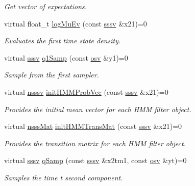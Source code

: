 \begin{DoxyCompactItemize}
\begin{DoxyCompactList}\small\item\em Get vector of expectations. \end{DoxyCompactList}\item 
virtual float\+\_\+t \hyperlink{classrbpf__hmm_af744e8a4961b5b51b7aea6ce515e0780}{log\+Mu\+Ev} (const \hyperlink{classrbpf__hmm_a28e8ad1d93bcf53cb74603f74826a81c}{sssv} \&x21)=0
\begin{DoxyCompactList}\small\item\em Evaluates the first time state density. \end{DoxyCompactList}\item 
virtual \hyperlink{classrbpf__hmm_a28e8ad1d93bcf53cb74603f74826a81c}{sssv} \hyperlink{classrbpf__hmm_a2e4a7f73efe8a3ba32e1762885624a42}{q1\+Samp} (const \hyperlink{classrbpf__hmm_adafd37687fdd3bb776d3d33a5b0e7080}{osv} \&y1)=0
\begin{DoxyCompactList}\small\item\em Sample from the first sampler. \end{DoxyCompactList}\item 
virtual \hyperlink{classrbpf__hmm_a7988465662f94f2ba45fd22566828d0f}{nsssv} \hyperlink{classrbpf__hmm_a3944acc8066774eaa0ff4330301447a1}{init\+H\+M\+M\+Prob\+Vec} (const \hyperlink{classrbpf__hmm_a28e8ad1d93bcf53cb74603f74826a81c}{sssv} \&x21)=0
\begin{DoxyCompactList}\small\item\em Provides the initial mean vector for each H\+MM filter object. \end{DoxyCompactList}\item 
virtual \hyperlink{classrbpf__hmm_a7ae942768da71581665168d3c3063c3f}{nsss\+Mat} \hyperlink{classrbpf__hmm_a997a21d39e1f692c28968000e809309a}{init\+H\+M\+M\+Trans\+Mat} (const \hyperlink{classrbpf__hmm_a28e8ad1d93bcf53cb74603f74826a81c}{sssv} \&x21)=0
\begin{DoxyCompactList}\small\item\em Provides the transition matrix for each H\+MM filter object. \end{DoxyCompactList}\item 
virtual \hyperlink{classrbpf__hmm_a28e8ad1d93bcf53cb74603f74826a81c}{sssv} \hyperlink{classrbpf__hmm_a449e0c123c92bbe4fedacad65f9ba7be}{q\+Samp} (const \hyperlink{classrbpf__hmm_a28e8ad1d93bcf53cb74603f74826a81c}{sssv} \&x2tm1, const \hyperlink{classrbpf__hmm_adafd37687fdd3bb776d3d33a5b0e7080}{osv} \&yt)=0
\begin{DoxyCompactList}\small\item\em Samples the time t second component. \end{DoxyCompactList}\item 

\end{DoxyCompactItemize}
